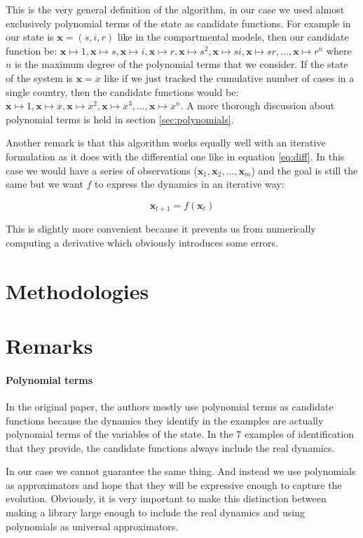 \documentclass[12pt, letterpaper]{article}
\begin{document}
This is the very general definition of the algorithm, in our case we used almost exclusively polynomial terms of the state as candidate functions. For example in our state is $\mathbf{x} = (s, i, r)$ like in the compartmental models, then our candidate function be: 
$\mathbf{x} \mapsto 1,
\mathbf{x} \mapsto s,
\mathbf{x} \mapsto i,
\mathbf{x} \mapsto r,
\mathbf{x} \mapsto s^2,
\mathbf{x} \mapsto si,
\mathbf{x} \mapsto sr,
\dots,
\mathbf{x} \mapsto r^n$ where $n$ is the maximum degree of the polynomial terms that we consider. If the state of the system is $\mathbf{x} = x$ like if we just tracked the cumulative number of cases in a single country, then the candidate functions would be: $\mathbf{x} \mapsto 1,
\mathbf{x} \mapsto x,
\mathbf{x} \mapsto x^2,
\mathbf{x} \mapsto x^3,
\dots,
\mathbf{x} \mapsto x^n$. A more thorough discussion about polynomial terms is held in section \ref{sec:polynomials}.

Another remark is that this algorithm works equally well with an iterative formulation as it does with the differential one like in equation \ref{eq:diff}.
In this case we would have a series of observations ($\mathbf{x}_1, \mathbf{x}_2, \dots, \mathbf{x}_m$) and the goal is still the same but we want $f$ to express the dynamics in an iterative way:

\begin{equation}\label{eq:it}
\mathbf{x}_{t+1} = f(\mathbf{x}_t)
\end{equation}

This is slightly more convenient because it prevents us from numerically computing a derivative which obviously introduces some errors.


\section{Methodologies}

\section{Remarks}

\paragraph{Polynomial terms} 
In the original paper, the authors mostly use polynomial terms as candidate functions because the dynamics they identify in the examples are actually polynomial terms of the variables of the state. In the 7 examples of identification that they provide, the candidate functions always include the real dynamics. 

In our case we cannot guarantee the same thing. And instead we use polynomials as approximators and hope that they will be expressive enough to capture the evolution. Obviously, it is very important to make this distinction between making a library large enough to include the real dynamics and using polynomials as universal approximators. 
\end{document}
